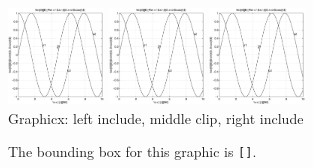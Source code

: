 \documentclass{article}
\begin{document}
\begin{center}
\includegraphics[width=1in]{graphics/example}
\includegraphics[width=1in,clip]{graphics/example}
\includegraphics[width=1in]{graphics/example}\\[1ex]
\textsf{Graphicx}: left include, middle clip, right include
\end{center}

The bounding box for this graphic is
\texttt{[\space{}\space{}\space{}]}.
\end{document}

